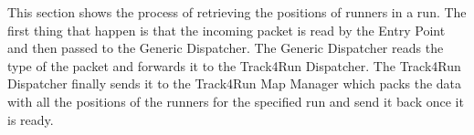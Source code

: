 This section shows the process of retrieving the positions of runners in a run. The first thing that happen is that the incoming packet is read by the Entry Point and then passed to the Generic Dispatcher. The Generic Dispatcher reads the type of the packet and forwards it to the Track4Run Dispatcher. The Track4Run Dispatcher finally sends it to the Track4Run Map Manager which packs the data with all the positions of the runners for the specified run and send it back once it is ready.